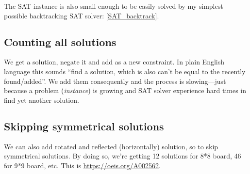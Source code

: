 The SAT instance is also small enough to be easily solved by my simplest possible backtracking SAT solver:
\ref{SAT_backtrack}.

\subsection{Counting all solutions}

We get a solution, negate it and add as a new constraint.
In plain English language this sounds ``find a solution, which is also can't be equal to the recently found/added''.
We add them consequently and the process is slowing---just because a problem (\textit{instance}) is growing and SAT solver
experience hard times in find yet another solution.

\subsection{Skipping symmetrical solutions}

We can also add rotated and reflected (horizontally) solution, so to skip symmetrical solutions.
By doing so, we're getting 12 solutions for 8*8 board, 46 for 9*9 board, etc.
This is \url{https://oeis.org/A002562}.


